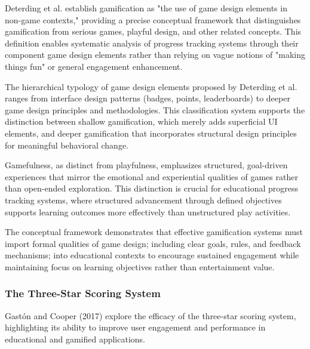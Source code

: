 {\color{maroon}
Deterding et al. establish gamification as "the use of game design elements in non-game contexts," providing a precise conceptual framework that distinguishes gamification from serious games, playful design, and other related concepts. This definition enables systematic analysis of progress tracking systems through their component game design elements rather than relying on vague notions of "making things fun" or general engagement enhancement.

The hierarchical typology of game design elements proposed by Deterding et al. ranges from interface design patterns (badges, points, leaderboards) to deeper game design principles and methodologies. This classification system supports the distinction between shallow gamification, which merely adds superficial UI elements, and deeper gamification that incorporates structural design principles for meaningful behavioral change.

Gamefulness, as distinct from playfulness, emphasizes structured, goal-driven experiences that mirror the emotional and experiential qualities of games rather than open-ended exploration. This distinction is crucial for educational progress tracking systems, where structured advancement through defined objectives supports learning outcomes more effectively than unstructured play activities.

The conceptual framework demonstrates that effective gamification systems must import formal qualities of game design; including clear goals, rules, and feedback mechanisms; into educational contexts to encourage sustained engagement while maintaining focus on learning objectives rather than entertainment value.
}

\subsubsection{The Three-Star Scoring System}

Gastón and Cooper (2017) explore the efficacy of the three-star scoring system, highlighting its ability to improve user engagement and performance in educational and gamified applications.


